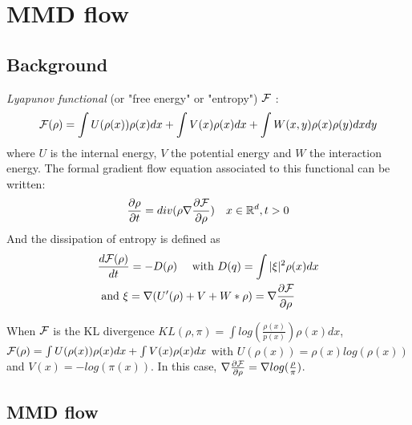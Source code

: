 \section{MMD flow}


\subsection{Background}

\textit{Lyapunov functional} (or "free energy" or "entropy") ${{\mathcal F}}$  \citep{villani2004trend}:
\begin{equation}
{{\mathcal F}}(\rho)=\int U(\rho(x)) \rho(x)dx + \int V(x)\rho(x)dx + \int W(x,y)\rho(x)\rho(y)dxdy
\end{equation}
where  $U$ is the internal energy, $V$ the potential energy and $W$ the
interaction energy. The formal gradient flow equation associated to this functional can be written:
\begin{equation}
\frac{\partial \rho}{\partial t}= div( \rho \nabla \frac{\partial {{\mathcal F}}}{\partial \rho}) \quad x \in {{\mathbb R}}^d , t>0
\end{equation}
And the dissipation of entropy is defined as %
\begin{align}
&        \frac{d {{\mathcal F}}(\rho)}{dt} =-D(\rho) \quad \text{ with } D(q)= \int |\xi|^2 \rho(x)dx\\
&\text{ and } \xi= \nabla (U'(\rho) + V + W * \rho)= \nabla \frac{\partial {{\mathcal F}}}{\partial \rho}
\end{align}

\begin{remark} When ${{\mathcal F}}$ is the KL divergence $KL(\rho,\pi)=\int log(\frac{\rho(x)}{p(x)})\rho(x)dx$, ${{\mathcal F}}(\rho)=\int U(\rho(x))\rho(x)dx + \int V(x) \rho(x)dx$ with $U(\rho(x))=\rho(x)log(\rho(x))$ and $V(x)=-log(\pi(x))$. In this case, $\nabla \frac{\partial {{\mathcal F}}}{\partial \rho}= \nabla log(\frac{\rho}{\pi})$.
\end{remark}

\subsection{MMD flow}

